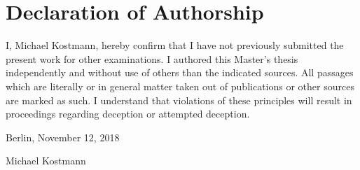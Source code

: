 
\section*{Declaration of Authorship}

I, Michael Kostmann, hereby confirm that I have not previously submitted the present work for other examinations. I authored this Master's thesis independently and without use of others than the indicated sources. All passages which are literally or in general matter taken out of publications or other sources are marked as such. I understand that violations of these principles will result in proceedings regarding deception or attempted deception.
\\\vspace{0.5cm}

\noindent Berlin, November 12, 2018 \\\vspace{0.1cm}

\noindent Michael Kostmann
